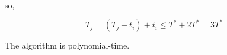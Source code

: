 \documentclass[a4paper]{article}
\begin{document}
so,

$$
	T_j = (T_{j}-t_{i}) + t_i \leq T^* + 2T^* = 3T^*
$$

The algorithm is polynomial-time.


%	

\end{document}

